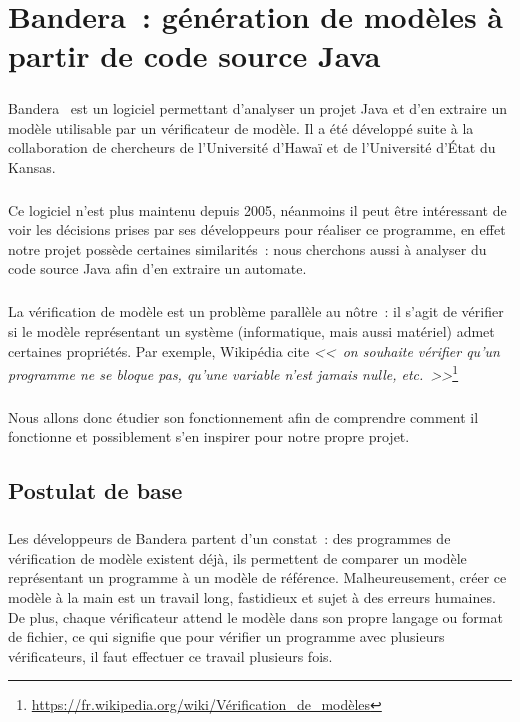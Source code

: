 \chapter{Bandera~: génération de modèles à partir de code source Java}

\paragraph{}
Bandera~\cite{bandera1} est un logiciel permettant d'analyser un
projet Java et d'en extraire un modèle utilisable par un vérificateur
de modèle. Il a été développé suite à la collaboration de chercheurs de
l'Université d'Hawaï et de l'Université d'État du Kansas.

\paragraph{}
Ce logiciel n'est plus maintenu depuis 2005, néanmoins il peut être
intéressant de voir les décisions prises par ses développeurs pour
réaliser ce programme, en effet notre projet possède certaines
similarités~: nous cherchons aussi à analyser du code source Java afin
d'en extraire un automate.

\paragraph{}
La vérification de modèle est un problème parallèle au nôtre~: il
s'agit de vérifier si le modèle représentant un système (informatique,
mais aussi matériel) admet certaines propriétés. Par exemple,
Wikipédia cite \textit{<<~on souhaite vérifier qu'un programme ne se
  bloque pas, qu'une variable n'est jamais nulle,
  etc.~>>}\footnote{\url{https://fr.wikipedia.org/wiki/Vérification_de_modèles}}

\paragraph{}
Nous allons donc étudier son fonctionnement afin de comprendre comment
il fonctionne et possiblement s'en inspirer pour notre propre projet.

\section{Postulat de base}

\paragraph{}
Les développeurs de Bandera partent d'un constat~: des programmes de
vérification de modèle existent déjà, ils permettent de comparer un
modèle représentant un programme à un modèle de
référence. Malheureusement, créer ce modèle à la main est un travail
long, fastidieux et sujet à des erreurs humaines. De plus, chaque
vérificateur attend le modèle dans son propre langage ou format de
fichier, ce qui signifie que pour vérifier un programme avec plusieurs
vérificateurs, il faut effectuer ce travail plusieurs fois.

